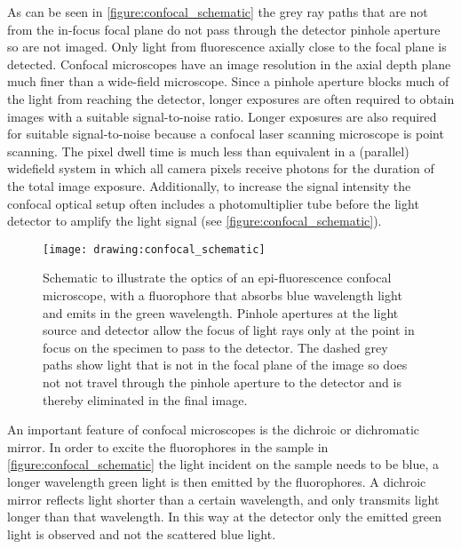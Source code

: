 As can be seen in \autoref{figure:confocal_schematic} the grey ray paths that are not from the in-focus focal plane do not pass through the detector pinhole aperture so are not imaged. Only light from fluorescence axially close to the focal plane is detected. Confocal microscopes have an image resolution in the axial depth plane much finer than a wide-field microscope. Since a pinhole aperture blocks much of the light from reaching the detector, longer exposures are often required to obtain images with a suitable signal-to-noise ratio. Longer exposures are also required for suitable signal-to-noise because a confocal laser scanning microscope is point scanning. The pixel dwell time is much less than equivalent in a (parallel) widefield system in which all camera pixels receive photons for the duration of the total image exposure. Additionally, to increase the signal intensity the confocal optical setup often includes a photomultiplier tube before the light detector to amplify the light signal (see \autoref{figure:confocal_schematic}).

\begin{figure}[htbp!]
	\centering
	\texttt{[image: drawing:confocal\_schematic]}
	\caption[Schematic of confocal microscopy optics]{Schematic to illustrate the optics of an epi-fluorescence confocal microscope, with a fluorophore that absorbs blue wavelength light and emits in the green wavelength. Pinhole apertures at the light source and detector allow the focus of light rays only at the point in focus on the specimen to pass to the detector. The dashed grey paths show light that is not in the focal plane of the image so does not not travel through the pinhole aperture to the detector and is thereby eliminated in the final image.}
	\label{figure:confocal_schematic}
\end{figure}

An important feature of confocal microscopes is the dichroic or dichromatic mirror. In order to excite the fluorophores in the sample in \autoref{figure:confocal_schematic} the light incident on the sample needs to be blue, a longer wavelength green light is then emitted by the fluorophores. A dichroic mirror reflects light shorter than a certain wavelength, and only transmits light longer than that wavelength. In this way at the detector only the emitted green light is observed and not the scattered blue light.

